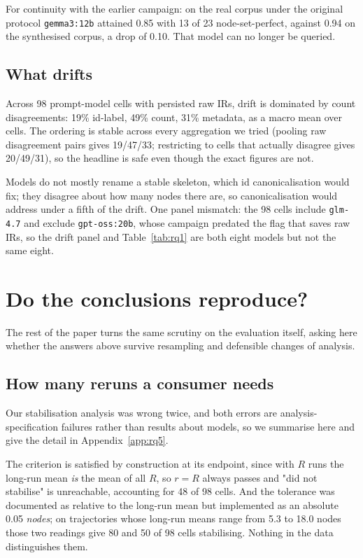 \documentclass{article}
\begin{document}
For continuity with the earlier campaign: on the real corpus under the original protocol \texttt{gemma3:12b} attained 0.85 with 13 of 23 node-set-perfect, against 0.94 on the synthesised corpus, a drop of 0.10. That model can no longer be queried.

\subsection{What drifts}

Across 98 prompt-model cells with persisted raw IRs, drift is dominated by count disagreements: 19\% id-label, 49\% count, 31\% metadata, as a macro mean over cells. The ordering is stable across every aggregation we tried (pooling raw disagreement pairs gives 19/47/33; restricting to cells that actually disagree gives 20/49/31), so the headline is safe even though the exact figures are not.

Models do not mostly rename a stable skeleton, which id canonicalisation would fix; they disagree about how many nodes there are, so canonicalisation would address under a fifth of the drift. One panel mismatch: the 98 cells include \texttt{glm-4.7} and exclude \texttt{gpt-oss:20b}, whose campaign predated the flag that saves raw IRs, so the drift panel and Table~\ref{tab:rq1} are both eight models but not the same eight.

\section{Do the conclusions reproduce?}
\label{sec:rq6}

The rest of the paper turns the same scrutiny on the evaluation itself, asking here whether the answers above survive resampling and defensible changes of analysis.

\subsection{How many reruns a consumer needs}

Our stabilisation analysis was wrong twice, and both errors are analysis-specification failures rather than results about models, so we summarise here and give the detail in Appendix~\ref{app:rq5}.

The criterion is satisfied by construction at its endpoint, since with $R$ runs the long-run mean \emph{is} the mean of all $R$, so $r=R$ always passes and "did not stabilise" is unreachable, accounting for 48 of 98 cells. And the tolerance was documented as relative to the long-run mean but implemented as an absolute 0.05 \emph{nodes}; on trajectories whose long-run means range from 5.3 to 18.0 nodes those two readings give 80 and 50 of 98 cells stabilising. Nothing in the data distinguishes them.
\end{document}
